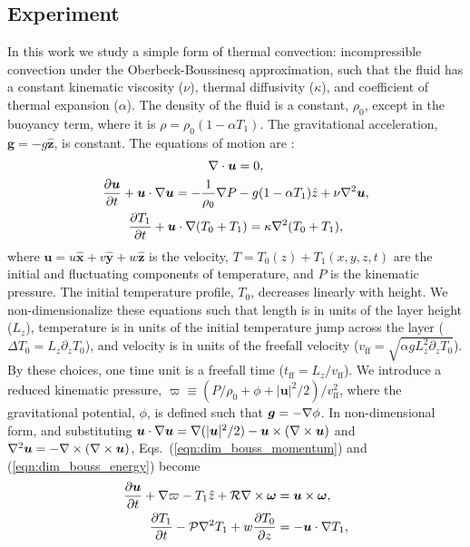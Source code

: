 \subsection{Experiment}
\label{sec:experiment}
In this work we study a simple form of thermal convection:
incompressible \RB convection under the Oberbeck-Boussinesq approximation,
such that the fluid
has a constant kinematic viscosity ($\nu$), thermal diffusivity ($\kappa$), and coefficient
of thermal expansion ($\alpha$). The density of the fluid is a constant, $\rho_0$,
except in the buoyancy term, where it is $\rho = \rho_0(1  - \alpha T_1)$.
The gravitational acceleration, $\bm{g} = - g\bm{\hat{z}}$, is constant.
The equations of motion are \cite{spiegel&veronis1960}:
\begin{gather}
\nabla\cdot\bm{u} = 0, 
	\label{eqn:incompressible}
\\
\frac{\partial \bm{u}}{\partial t} + \bm{u}\cdot\nabla\bm{u} =
-\frac{1}{\rho_0}\nabla P - g( 1 - \alpha T_1)\hat{z} + \nu\nabla^2\bm{u}, 
	\label{eqn:dim_bouss_momentum}
\\
\frac{\partial T_1}{\partial t} + \bm{u}\cdot\nabla(T_0 + T_1) = \kappa\nabla^2 (T_0 + T_1),
	\label{eqn:dim_bouss_energy}
\end{gather}
where $\bm{u} = u\bm{\hat{x}} + v\bm{\hat{y}} + w\bm{\hat{z}}$ is the velocity, 
$T = T_0(z) + T_1(x, y, z, t)$ are the initial and fluctuating components of temperature, 
and $P$ is the kinematic pressure. The initial temperature profile, $T_0$, decreases
linearly with height.
We non-dimensionalize these equations such that
length is in units of the layer height ($L_z$),
temperature is in units of the initial temperature jump across the layer ($\Delta T_0 = L_z \partial_z T_0$), 
and velocity is in units of the freefall velocity ($v_{\text{ff}} = \sqrt{\alpha g L_z^2 \partial_z T_0}$).
By these choices, one time unit is a freefall time ($t_{\text{ff}} = L_z/v_{\text{ff}}$).
We introduce a reduced kinematic pressure,
$\varpi \equiv (P / \rho_0 + \phi + |\bm{u}|^2 / 2) / v_{\text{ff}}^2$, where the gravitational
potential, $\phi$, is defined such that $\bm{g} = -\nabla \phi$. 
In non-dimensional form, and substituting 
$\bm{u}\cdot\nabla\bm{u} = \nabla(|\bm{u}|^2/2) - \bm{u}\times(\nabla\times\bm{u})$
and $\nabla^2\bm{u} = -\nabla\times(\nabla\times\bm{u})$, Eqs.~(\ref{eqn:dim_bouss_momentum}) and (\ref{eqn:dim_bouss_energy})
become
\begin{align}
\frac{\partial \bm{u}}{\partial t} + \nabla \varpi - T_1\hat{z} + \mathcal{R}\nabla\times\bm{\omega} &= \bm{u}\times\bm{\omega},
	\label{eqn:bouss_momentum}
\\
\frac{\partial T_1}{\partial t} - \mathcal{P}\nabla^2 T_1 + w \frac{\partial T_0}{\partial z} &= - \bm{u}\cdot\nabla T_1,
	\label{eqn:bouss_energy}
\end{align}
